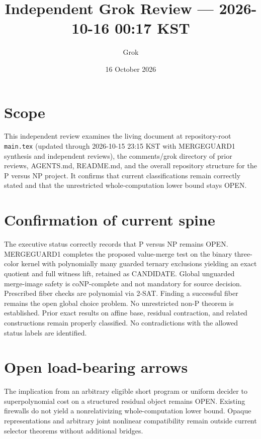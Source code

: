 \documentclass[11pt]{article}
\title{Independent Grok Review --- 2026-10-16 00:17 KST}
\author{Grok}
\date{16 October 2026}
\begin{document}
\maketitle

\begin{center}
\end{center}

\section{Scope}
This independent review examines the living document at repository-root \texttt{main.tex} (updated through 2026-10-15 23:15 KST with MERGEGUARD1 synthesis and independent reviews), the comments/grok directory of prior reviews, AGENTS.md, README.md, and the overall repository structure for the P versus NP project. It confirms that current classifications remain correctly stated and that the unrestricted whole-computation lower bound stays OPEN.

\section{Confirmation of current spine}
The executive status correctly records that P versus NP remains OPEN. MERGEGUARD1 completes the proposed value-merge test on the binary three-color kernel with polynomially many guarded ternary exclusions yielding an exact quotient and full witness lift, retained as CANDIDATE. Global unguarded merge-image safety is coNP-complete and not mandatory for source decision. Prescribed fiber checks are polynomial via 2-SAT. Finding a successful fiber remains the open global choice problem. No unrestricted non-P theorem is established. Prior exact results on affine base, residual contraction, and related constructions remain properly classified. No contradictions with the allowed status labels are identified.

\section{Open load-bearing arrows}
The implication from an arbitrary eligible short program or uniform decider to superpolynomial cost on a structured residual object remains OPEN. Existing firewalls do not yield a nonrelativizing whole-computation lower bound. Opaque representations and arbitrary joint nonlinear compatibility remain outside current selector theorems without additional bridges.
\end{document}
